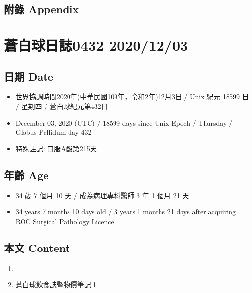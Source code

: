 \documentclass[a5paper, 10pt
]{book}
\providecommand{\tightlist}{%
  \setlength{\itemsep}{0pt}\setlength{\parskip}{0pt}}
\begin{document}
\hypertarget{ux9644ux9304-appendix-1}{%
\subsection{附錄 Appendix}\label{ux9644ux9304-appendix-1}}

\hypertarget{ux84bcux767dux7403ux65e5ux8a8c0432-20201203}{%
\section{蒼白球日誌0432
2020/12/03}\label{ux84bcux767dux7403ux65e5ux8a8c0432-20201203}}

\hypertarget{ux65e5ux671f-date-2}{%
\subsection{日期 Date}\label{ux65e5ux671f-date-2}}

\begin{itemize}
\tightlist
\item
  世界協調時間2020年(中華民國109年，令和2年)12月3日 / Unix 紀元 18599 日
  / 星期四 / 蒼白球紀元第432日
\item
  December 03, 2020 (UTC) / 18599 days since Unix Epoch / Thursday /
  Globus Pallidum day 432
\item
  特殊註記: 口服A酸第215天
\end{itemize}

\hypertarget{ux5e74ux9f61-age-2}{%
\subsection{年齡 Age}\label{ux5e74ux9f61-age-2}}

\begin{itemize}
\tightlist
\item
  34 歲 7 個月 10 天 / 成為病理專科醫師 3 年 1 個月 21 天
\item
  34 years 7 months 10 days old / 3 years 1 months 21 days after
  acquiring ROC Surgical Pathology Licence
\end{itemize}

\hypertarget{ux672cux6587-content-2}{%
\subsection{本文 Content}\label{ux672cux6587-content-2}}

\begin{enumerate}
\def\labelenumi{\arabic{enumi}.}
\tightlist
\item
\item
  蒼白球飲食誌暨物價筆記{[}1{]}
\end{enumerate}
\end{document}

